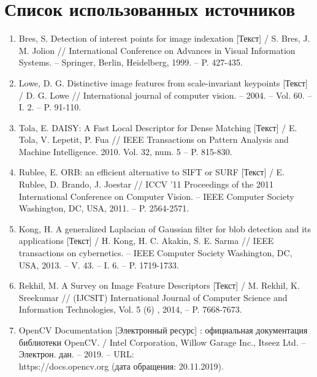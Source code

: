 {{{\section*{Список использованных источников}
{
	\begin{enumerate}[label=\arabic*]
	\item{Bres, S. Detection of interest points for image indexation [Текст] / S. Bres, J. M. Jolion // International Conference on Advances in Visual Information Systems. -- Springer, Berlin, Heidelberg, 1999. -- P. 427-435.}{\label{interest points}}	
	\item{Lowe, D. G. Distinctive image features from scale-invariant keypoints [Текст] / D. G. Lowe // International journal of computer vision. -- 2004. -- Vol. 60. -- I. 2. -- P. 91-110.}\label{lowe surf}
	\item{Tola, E. DAISY: A Fast Local Descriptor for Dense Matching [Текст] / E. Tola, V. Lepetit, P. Fua // IEEE Transactions on Pattern Analysis and Machine Intelligence. 2010. Vol. 32, num. 5  -- P. 815-830.}{\label{tola_paper}}	
	\item{Rublee, E. ORB: an efficient alternative to SIFT or SURF [Текст] / E. Rublee, D. Brando, J. Joestar // ICCV '11 Proceedings of the 2011 International Conference on Computer Vision. -- IEEE Computer Society Washington, DC, USA, 2011. -- P. 2564-2571. }\label{rublee orb}
	\item{Kong, H. A generalized Laplacian of Gaussian filter for blob detection and its applications [Текст] / H. Kong, H. C. Akakin, S. E. Sarma // IEEE transactions on cybernetics. -- IEEE Computer Society Washington, DC, USA, 2013. -- V. 43. -- I. 6. -- P. 1719-1733.}{\label{imagematching paper}}
	\item{Rekhil, M. A Survey on Image Feature Descriptors [Текст] / M. Rekhil, K. Sreekumar //  (IJCSIT) International Journal of Computer Science and Information Technologies, Vol. 5 (6) , 2014, -- P. 7668-7673.}{\label{imagematching paper}}
 	\item{OpenCV Documentation [Электронный ресурс] : официальная документация библиотеки OpenCV. / Intel Corporation, Willow Garage Inc., Itseez Ltd. -- Электрон. дан. -- 2019. -- URL: \\https://docs.opencv.org (дата обращения: 20.11.2019). }{\label{cv docs}}

\end{enumerate}}}}}

